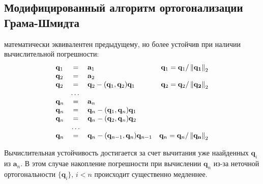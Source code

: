 \subsection*{Модифицированный алгоритм ортогонализации Грама-Шмидта}
математически эквивалентен предыдущему, но более устойчив при наличии
вычислительной погрешности:
\[
  \begin{array}{lclr}
    \mathbf{q}_1 & =      & \mathbf{a}_1                                                   & \mathbf{q}_1=\mathbf{q}_1/\left\lVert\mathbf{q_1}\right\rVert_{2} \\
    \mathbf{q}_2 & =      & \mathbf{a}_2                                                   &                                          \\
    \mathbf{q}_2 & =      & \mathbf{q}_2-(\mathbf{q}_1, \mathbf{q}_2)\mathbf{q}_1          & \mathbf{q}_2=\mathbf{q}_2/\left\lVert\mathbf{q_2}\right\rVert_{2} \\
                 & \dots  &                                                                &                                          \\
    \mathbf{q}_n & =      & \mathbf{a}_n                                                   &                                          \\
    \mathbf{q}_n & =      & \mathbf{q}_n -(\mathbf{q}_1, \mathbf{q}_n)\mathbf{q}_1         &                                          \\
    \mathbf{q}_n & =      & \mathbf{q}_n -(\mathbf{q}_2, \mathbf{q}_n)\mathbf{q}_2         &                                          \\
                 & \ldots &                                                                &                                          \\
    \mathbf{q}_n & =      & \mathbf{q}_n -(\mathbf{q}_{n-1}, \mathbf{q}_n)\mathbf{q}_{n-1} & \mathbf{q}_n=\mathbf{q}_n/\left\lVert\mathbf{q_n}\right\rVert_{2} \\
  \end{array}
\]

Вычислительная устойчивость достигается за счет вычитания уже наайденных
$\mathbf{q}_i$ из $\mathbf{a}_n$. В этом случае накопление погрешности при вычислении $\mathbf{q}_n$
из-за неточной ортогональности $\{\mathbf{q}_i\}$, $i<n$ происходит существенно медленнее.
